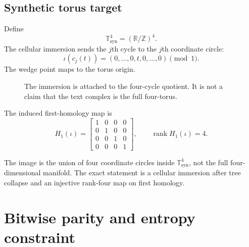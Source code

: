 \documentclass[10pt,a4paper]{article}
\newcommand{\Tfour}{\mathbb T^4_{\mathrm{syn}}}
\newcommand{\bettiOne}{\beta_1}
\begin{document}
\subsection{Synthetic torus target}
Define
\[
\Tfour=(\mathbb R/\mathbb Z)^4.
\]
The cellular immersion sends the $j$th cycle to the $j$th coordinate circle:
\[
\iota(c_j(t))=(0,\ldots,0,t,0,\ldots,0)\pmod 1.
\]
The wedge point maps to the torus origin.

\begin{figure}[H]
\centering
{}
\caption{The immersion is attached to the four-cycle quotient. It is not a claim that the text complex is the full four-torus.}
\end{figure}

The induced first-homology map is
\[
H_1(\iota)=
\begin{bmatrix}
1&0&0&0\\
0&1&0&0\\
0&0&1&0\\
0&0&0&1
\end{bmatrix},
\qquad
\operatorname{rank}H_1(\iota)=4.
\]

\begin{boundbox}
The image is the union of four coordinate circles inside $\Tfour$, not the full four-dimensional manifold. The exact statement is a cellular immersion after tree collapse and an injective rank-four map on first homology.
\end{boundbox}

\section{Bitwise parity and entropy constraint}
\end{document}
